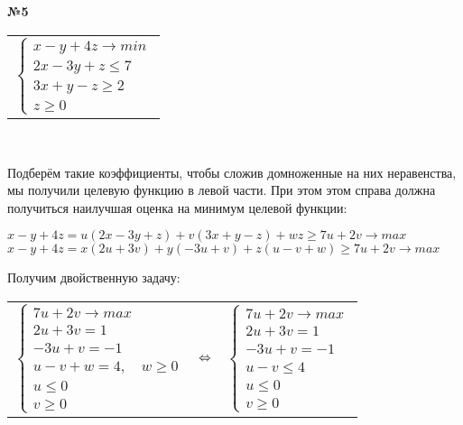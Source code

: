 \documentclass{article}
\newenvironment{task}{\begin{center}\fontsize{14}{14}\selectfont\bf}{\rm\fontsize{12}{12}\selectfont\end{center}}
\begin{document}


	\begin{task} 
		№5
	\end{task}
	\begin{center}
		\begin{tabular}{c}
			$\begin{cases}
			x-y+4z \rightarrow min \\
			2x-3y+z \leq 7 \\
			3x+y-z \geq 2 \\
			z \geq 0
			\end{cases}$
		\end{tabular}\\
	\end{center}
	Подберём такие коэффициенты, чтобы сложив домноженные на них неравенства, мы получили целевую функцию в левой части. При этом этом справа должна получиться наилучшая оценка на минимум целевой функции:
	\begin{center}
		$x-y+4z = u(2x-3y+z) + v(3x+y-z ) + wz \geq 7u+2v \rightarrow max$ \\
		$x-y+4z = x(2u+3v) + y(-3u+v) + z(u-v+w) \geq 7u+2v \rightarrow max$ \\
	\end{center}
	Получим двойственную задачу:
	\begin{center}
		\begin{tabular}{ccc}
			$\begin{cases}
			7u+2v \rightarrow max \\
			2u+3v = 1 \\
			-3u+v = -1 \\
			u-v+w = 4, \quad w \geq 0  \\
			u \leq 0 \\
			v \geq 0
			\end{cases}$
			& $\hfill \Leftrightarrow \hfill$ &
			$\begin{cases}
			7u+2v \rightarrow max \\
			2u+3v = 1 \\
			-3u+v = -1 \\
			u-v \leq 4 \\
			u \leq 0 \\
			v \geq 0
			\end{cases}$
		\end{tabular}\\
	\end{center}
\end{document}
